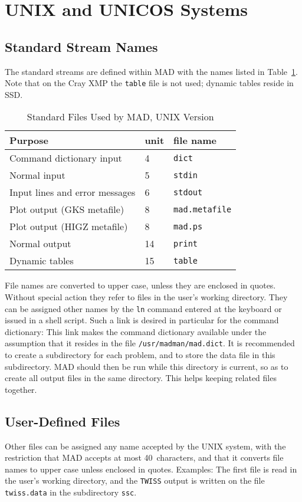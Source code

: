 \section{UNIX and UNICOS Systems}
\label{S-UNIX}
\subsection{Standard Stream Names}
The standard streams are defined within MAD with the names listed in
Table~\ref{T-UNIX}.
Note that on the Cray XMP the {\tt table} file is not used;
dynamic tables reside in SSD.
\begin{table}[ht]
\caption{Standard Files Used by MAD, UNIX Version}
\vspace{1ex}
\label{T-UNIX}
\centering
\begin{tabular}{|l|l|l|}
\hline
Purpose                         &unit  &file name \\
\hline
Command dictionary input        & 4    &{\tt dict} \\
Normal input                    & 5    &{\tt stdin} \\
Input lines and error messages  & 6    &{\tt stdout} \\
Plot output (GKS metafile)      & 8    &{\tt mad.metafile} \\
Plot output (HIGZ metafile)     & 8    &{\tt mad.ps} \\
Normal output                   &14    &{\tt print} \\
Dynamic tables                  &15    &{\tt table} \\
\hline
\end{tabular}
\end{table}
File names are converted to upper case, unless they are enclosed in quotes.
Without special action they refer to files in the
user's working directory.
They can be assigned other names by the {\tt ln} command
entered at the keyboard or issued in a shell script.
Such a link is desired in particular for the command dictionary:
This link makes the command dictionary available under the assumption
that it resides in the file {\tt /usr/madman/mad.dict}.
It is recommended to create a subdirectory for each problem,
and to store the data file in this subdirectory.
MAD should then be run while this directory is current,
so as to create all output files in the same directory.
This helps keeping related files together.
 
\subsection{User-Defined Files}
Other files can be assigned any name accepted by the UNIX system,
with the restriction that MAD accepts at most 40~characters,
and that it converts file names to upper case unless enclosed in quotes.
Examples:
The first file is read in the user's working directory,
and the {\tt TWISS} output is written on the file {\tt twiss.data}
in the subdirectory {\tt ssc}.
 
